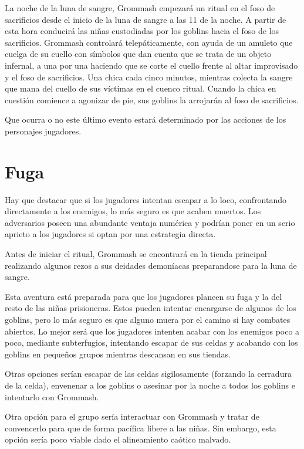 \documentclass[10pt,twoside,twocolumn,openany]{dndbook}
\begin{document}
La noche de la luna de sangre, Grommash empezará un ritual en el foso de sacrificios desde el inicio de la 
luna de sangre a las 11 de la noche. A partir de esta hora conducirá las niñas custodiadas por los 
goblins hacia el foso de los sacrificios. Grommash controlará telepáticamente, con ayuda de un 
amuleto que cuelga de su cuello con símbolos que dan cuenta que se trata de un objeto infernal, 
a una por una haciendo que se corte el cuello frente al altar improvisado y el foso de sacrificios. 
Una chica cada cinco minutos, mientras colecta la sangre que mana del cuello de sus víctimas en el 
cuenco ritual. Cuando la chica en cuestión comience a agonizar de pie, sus goblins la arrojarán al 
foso de sacrificios.

Que ocurra o no este último evento estará determinado por las acciones de los personajes jugadores.

\section{Fuga}

Hay que destacar que si los jugadores intentan escapar a lo loco, confrontando directamente a los 
enemigos, lo más seguro es que acaben muertos. Los adversarios poseen una abundante ventaja numérica y 
podrían poner en un serio aprieto a los jugadores si optan por una estrategia directa.

Antes de iniciar el ritual, Grommash se encontrará en la tienda principal realizando algunos
rezos a sus deidades demoníacas preparandose para la luna de sangre.

Esta aventura está preparada para que los jugadores planeen su fuga y la del resto de las niñas prisioneras. 
Estos pueden intentar encargarse de algunos de los goblins, pero lo más seguro es que alguno muera por 
el camino si hay combates abiertos. Lo mejor será que los jugadores intenten acabar con los enemigos 
poco a poco, mediante subterfugios, intentando escapar de sus celdas y acabando con los goblins en 
pequeños grupos mientras descansan en sus tiendas.

Otras opciones serían escapar de las celdas sigilosamente (forzando la cerradura de la celda), envenenar 
a los goblins o asesinar por la noche a todos los goblins e intentarlo con Grommash. 

Otra opción para el grupo sería interactuar con Grommash y tratar de convencerlo para que de forma 
pacífica libere a las niñas. Sin embargo, esta opción sería poco viable dado el alineamiento 
caótico malvado.
\end{document}
